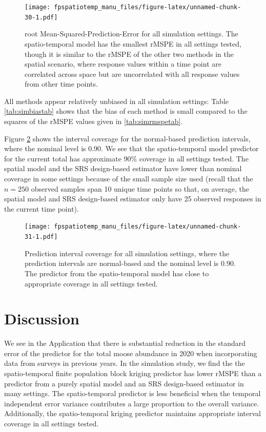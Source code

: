 \documentclass[]{interact}
\theoremstyle{plain}%
\theoremstyle{definition}
\theoremstyle{remark}
\begin{document}
\begin{figure}
\centering
\texttt{[image: fpspatiotemp\_manu\_files/figure-latex/unnamed-chunk-30-1.pdf]}
\caption{\label{fig:rmspe} root Mean-Squared-Prediction-Error for all
simulation settings. The spatio-temporal model has the smallest rMSPE in
all settings tested, though it is similar to the rMSPE of the other two
methods in the spatial scenario, where response values within a time
point are correlated across space but are uncorrelated with all response
values from other time points.}
\end{figure}

All methods appear relatively unbiased in all simulation settings: Table
\ref{tab:simbiastab} shows that the bias of each method is small
compared to the squares of the rMSPE values given in
\ref{tab:simrmspetab}.

Figure \ref{fig:pi} shows the interval coverage for the normal-based
prediction intervals, where the nominal level is 0.90. We see that the
spatio-temporal model predictor for the current total has approximate
90\% coverage in all settings tested. The spatial model and the SRS
design-based estimator have lower than nominal coverage in some settings
because of the small sample size used (recall that the \(n = 250\)
observed samples span 10 unique time points so that, on average, the
spatial model and SRS design-based estimator only have 25 observed
responses in the current time point).

\begin{figure}
\centering
\texttt{[image: fpspatiotemp\_manu\_files/figure-latex/unnamed-chunk-31-1.pdf]}
\caption{\label{fig:pi} Prediction interval coverage for all simulation
settings, where the prediction intervals are normal-based and the
nominal level is 0.90. The predictor from the spatio-temporal model has
close to appropriate coverage in all settings tested.}
\end{figure}

\section{Discussion} \label{section:Discussion}

We see in the Application that there is substantial reduction in the
standard error of the predictor for the total moose abundance in 2020
when incorporating data from surveys in previous years. In the
simulation study, we find the the spatio-temporal finite population
block kriging predictor has lower rMSPE than a predictor from a purely
spatial model and an SRS design-based estimator in many settings. The
spatio-temporal predictor is less beneficial when the temporal
independent error variance contributes a large proportion to the overall
variance. Additionally, the spatio-temporal kriging predictor maintains
appropriate interval coverage in all settings tested.
\end{document}
